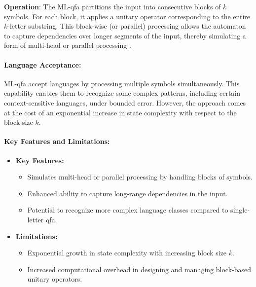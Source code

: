 \textbf{Operation}:  
The ML-qfa partitions the input into consecutive blocks of \( k \) symbols. For each block, it applies a unitary operator corresponding to the entire \( k \)-letter substring. This block-wise (or parallel) processing allows the automaton to capture dependencies over longer segments of the input, thereby simulating a form of multi-head or parallel processing \cite{belovs2007multi}.

\paragraph{Language Acceptance:}  
ML-qfa accept languages by processing multiple symbols simultaneously. This capability enables them to recognize some complex patterns, including certain context-sensitive languages, under bounded error. However, the approach comes at the cost of an exponential increase in state complexity with respect to the block size \( k \).

\paragraph{Key Features and Limitations:}
\begin{itemize}
    \item \textbf{Key Features:}
    \begin{itemize}
        \item Simulates multi-head or parallel processing by handling blocks of symbols.
        \item Enhanced ability to capture long-range dependencies in the input.
        \item Potential to recognize more complex language classes compared to single-letter qfa.
    \end{itemize}
    \item \textbf{Limitations:}
    \begin{itemize}
        \item Exponential growth in state complexity with increasing block size \( k \).
        \item Increased computational overhead in designing and managing block-based unitary operators.
    \end{itemize}
\end{itemize}

